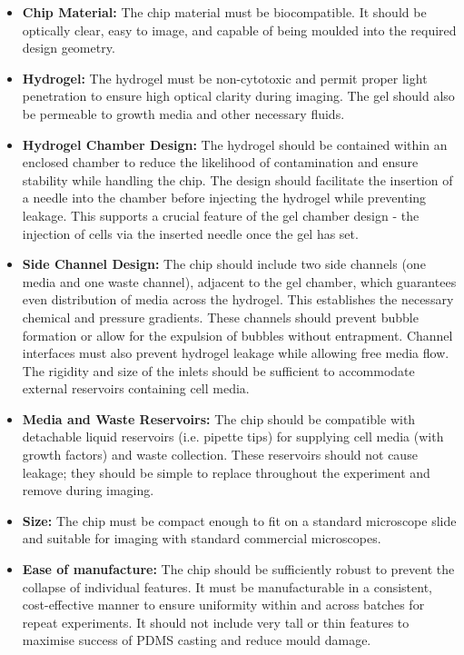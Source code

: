 \documentclass[letterpaper,12pt]{article}
\begin{document}
\begin{itemize}


    \item \textbf{Chip Material:} The chip material must be biocompatible. It should be optically clear, easy to image, and capable of being moulded into the required design geometry. 

    \item \textbf{Hydrogel:} The hydrogel must be non-cytotoxic and permit proper light penetration to ensure high optical clarity during imaging. The gel should also be permeable to growth media and other necessary fluids. 


\item \textbf{Hydrogel Chamber Design:} The hydrogel should be contained within an enclosed chamber to reduce the likelihood of contamination and ensure stability while handling the chip. The design should facilitate the insertion of a needle into the chamber before injecting the hydrogel while preventing leakage. This supports a crucial feature of the gel chamber design - the injection of cells via the inserted needle once the gel has set. 


    \item \textbf{Side Channel Design:} The chip should include two side channels (one media and one waste channel), adjacent to the gel chamber, which guarantees even distribution of media across the hydrogel. This establishes the necessary chemical and pressure gradients. These channels should prevent bubble formation or allow for the expulsion of bubbles without entrapment. Channel interfaces must also prevent hydrogel leakage while allowing free media flow. The rigidity and size of the inlets should be sufficient to accommodate external reservoirs containing cell media. 

    \item \textbf{Media and Waste Reservoirs:} The chip should be compatible with detachable liquid reservoirs (i.e. pipette tips) for supplying cell media (with growth factors) and waste collection. These reservoirs should not cause leakage; they should be simple to replace throughout the experiment and remove during imaging. 

    \item \textbf{Size:} The chip must be compact enough to fit on a standard microscope slide and suitable for imaging with standard commercial microscopes. 

    \item \textbf{Ease of manufacture:} The chip should be sufficiently robust to prevent the collapse of individual features. It must be manufacturable in a consistent, cost-effective manner to ensure uniformity within and across batches for repeat experiments. It should not include very tall or thin features to maximise success of PDMS casting and reduce mould damage. 


\end{itemize}
\end{document}
